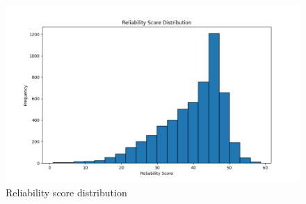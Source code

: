 \begin{figure}[htbp]
    \centering
    \includegraphics[width=0.9\linewidth]{figures/reliability_score_hist.png}
    \caption{Reliability score distribution}
    \label{fig:reliability_score_hist}
\end{figure}


